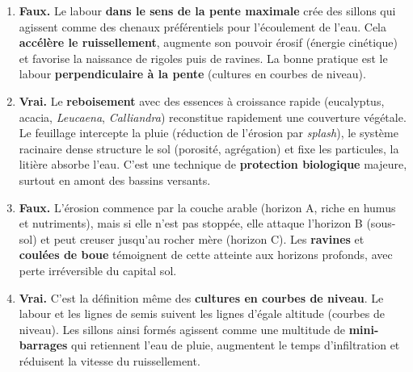 \documentclass[11pt]{article}
\begin{document}
\begin{corrige}
\begin{enumerate}
    \item \textbf{Faux.} Le labour \textbf{dans le sens de la pente maximale} crée des sillons qui agissent comme des chenaux préférentiels pour l'écoulement de l'eau. Cela \textbf{accélère le ruissellement}, augmente son pouvoir érosif (énergie cinétique) et favorise la naissance de rigoles puis de ravines. La bonne pratique est le labour \textbf{perpendiculaire à la pente} (cultures en courbes de niveau).
    \item \textbf{Vrai.} Le \textbf{reboisement} avec des essences à croissance rapide (eucalyptus, acacia, \textit{Leucaena}, \textit{Calliandra}) reconstitue rapidement une couverture végétale. Le feuillage intercepte la pluie (réduction de l'érosion par \emph{splash}), le système racinaire dense structure le sol (porosité, agrégation) et fixe les particules, la litière absorbe l'eau. C'est une technique de \textbf{protection biologique} majeure, surtout en amont des bassins versants.
    \item \textbf{Faux.} L'érosion commence par la couche arable (horizon A, riche en humus et nutriments), mais si elle n'est pas stoppée, elle attaque l'horizon B (sous-sol) et peut creuser jusqu'au rocher mère (horizon C). Les \textbf{ravines} et \textbf{coulées de boue} témoignent de cette atteinte aux horizons profonds, avec perte irréversible du capital sol.
    \item \textbf{Vrai.} C'est la définition même des \textbf{cultures en courbes de niveau}. Le labour et les lignes de semis suivent les lignes d'égale altitude (courbes de niveau). Les sillons ainsi formés agissent comme une multitude de \textbf{mini-barrages} qui retiennent l'eau de pluie, augmentent le temps d'infiltration et réduisent la vitesse du ruissellement.
\end{enumerate}
\end{corrige}
\end{document}
